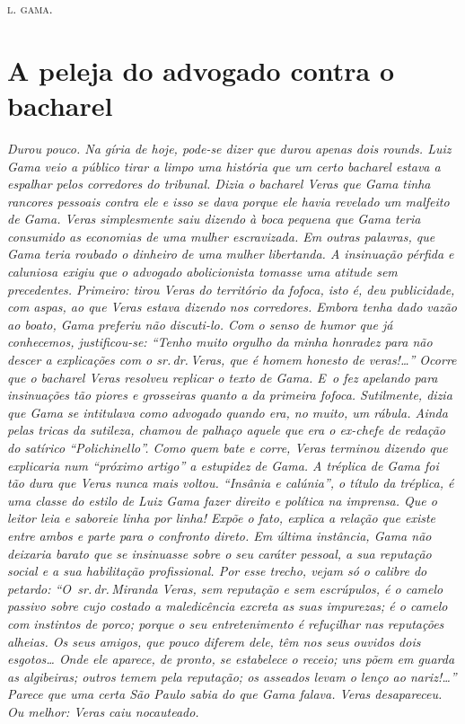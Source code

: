 {\hfill\textsc{l. gama.}

\part{A peleja do advogado contra o bacharel}

\begin{didas}
\emph{Durou pouco. Na gíria de hoje, pode-se dizer que durou apenas dois
rounds. Luiz Gama veio a público tirar a limpo uma história que um certo
bacharel estava a espalhar pelos corredores do tribunal. Dizia o
bacharel Veras que Gama tinha rancores pessoais contra ele e isso se
dava porque ele havia revelado um malfeito de Gama. Veras simplesmente
saiu dizendo à boca pequena que Gama teria consumido as economias de uma
mulher escravizada. Em outras palavras, que Gama teria roubado o
dinheiro de uma mulher libertanda. A insinuação pérfida e caluniosa
exigiu que o advogado abolicionista tomasse uma atitude sem precedentes.
Primeiro: tirou Veras do território da fofoca, isto é, deu publicidade,
com aspas, ao que Veras estava dizendo nos corredores. Embora tenha dado
vazão ao boato, Gama preferiu não discuti-lo. Com o senso de humor que
já conhecemos, justificou-se: ``Tenho muito orgulho da minha honradez
para não descer a explicações com o sr.\,dr.\,Veras, que é homem honesto
de veras!\ldots{}'' Ocorre que o bacharel Veras resolveu replicar o texto de
Gama. E~o fez apelando para insinuações tão piores e grosseiras quanto a
da primeira fofoca. Sutilmente, dizia que Gama se intitulava como
advogado quando era, no muito, um rábula. Ainda pelas tricas da
sutileza, chamou de palhaço aquele que era o ex-chefe de redação do
satírico ``Polichinello''. Como quem bate e corre, Veras terminou
dizendo que explicaria num ``próximo artigo'' a estupidez de Gama. A
tréplica de Gama foi tão dura que Veras nunca mais voltou. ``Insânia e
calúnia'', o título da tréplica, é uma classe do estilo de Luiz
Gama fazer direito e política na imprensa. Que o leitor leia e saboreie
linha por linha! Expõe o fato, explica a relação que existe entre ambos
e parte para o confronto direto. Em última instância, Gama não deixaria
barato que se insinuasse sobre o seu caráter pessoal, a sua reputação
social e a sua habilitação profissional. Por esse trecho, vejam só o
calibre do petardo: ``O~sr.\,dr.\,Miranda Veras, sem reputação e sem
escrúpulos, é o camelo passivo sobre cujo costado a maledicência excreta
as suas impurezas; é o camelo com instintos de porco; porque o seu
entretenimento é refuçilhar nas reputações alheias. Os seus amigos, que
pouco diferem dele, têm nos seus ouvidos dois esgotos\ldots{} Onde ele
aparece, de pronto, se estabelece o receio; uns põem em guarda as
algibeiras; outros temem pela reputação; os asseados levam o lenço ao
nariz!\ldots{}'' Parece que uma certa São Paulo sabia do que Gama falava.
Veras desapareceu. Ou melhor: Veras caiu nocauteado. }
\end{didas}

}
